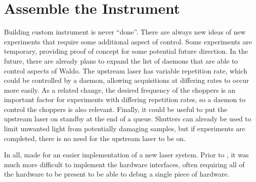\clearpage

\section{Assemble the Instrument}  %

Building custom instrument is never ``done''.
There are always new ideas of new experiments that require some additional aspect of control.
Some experiments are temporary, providing proof of concept for some potential future direction.
In the future, there are already plans to expand the list of daemons that are able to control aspects of Waldo.
The upstream laser has variable repetition rate, which could be controlled by a daemon, allowing acquisitions at differing rates to occur more easily.
As a related change, the desired frequency of the choppers is an important factor for experiments with differing repetition rates, so a daemon to control the choppers is also relevant.
Finally, it could be useful to put the upstream laser on standby at the end of a queue.
Shutters can already be used to limit unwanted light from potentially damaging samples, but if experiments are completed, there is no need for the upstream laser to be on.

In all, \yaq{} made for an easier implementation of a new laser system.
Prior to \yaq{}, it was much more difficult to implement the hardware interfaces, often requiring all of the hardware to be present to be able to debug a single piece of hardware.

\clearpage
